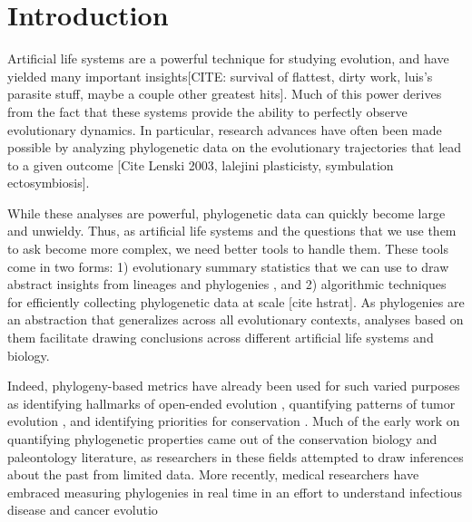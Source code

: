 \section{Introduction} \label{sec:introduction}

Artificial life systems are a powerful technique for studying evolution, and have yielded many important insights[CITE: survival of flattest, dirty work, luis's parasite stuff, maybe a couple other greatest hits]. Much of this power derives from the fact that these systems provide the ability to perfectly observe evolutionary dynamics. In particular, research advances have often been made possible by analyzing phylogenetic data on the evolutionary trajectories that lead to a given outcome [Cite Lenski 2003, lalejini plasticisty, symbulation ectosymbiosis].

While these analyses are powerful, phylogenetic data can quickly become large and unwieldy. Thus, as artificial life systems and the questions that we use them to ask become more complex, we need better tools to handle them. These tools come in two forms: 1) evolutionary summary statistics that we can use to draw abstract insights from lineages and phylogenies \citep{dolsonInterpretingTapeLife2020}, and 2) algorithmic techniques for efficiently collecting phylogenetic data at scale [cite hstrat]. As phylogenies are an abstraction that generalizes across all evolutionary contexts, analyses based on them facilitate drawing conclusions across different artificial life systems and biology. 



Indeed, phylogeny-based metrics have already been used for such varied purposes as identifying hallmarks of open-ended evolution \citep{dolsonMODESToolboxMeasurements2019}, quantifying patterns of tumor evolution \citep{scottInferringTumorProliferative2020, lewinsohnStatedependentEvolutionaryModels2023}, and identifying priorities for conservation \citep{forestPreservingEvolutionaryPotential2007}. Much of the early work on quantifying phylogenetic properties came out of the conservation biology and paleontology literature, as researchers in these fields attempted to draw inferences about the past from limited data. More recently, medical researchers have embraced measuring phylogenies in real time in an effort to understand infectious disease and cancer evolutio


